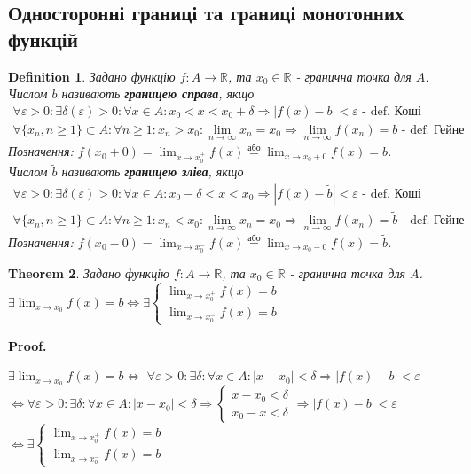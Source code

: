 \documentclass[a4paper, 14pt]{article}
\makeatletter
\def\qed{$\blacksquare$}
\theoremstyle{theoremdd}
\newtheorem{theorem}{Theorem}[subsection]
\theoremstyle{theoremdd}
\newtheorem{definition}[theorem]{Definition}
\theoremstyle{theoremdd}
\theoremstyle{theoremdd}
\theoremstyle{theoremdd}
\theoremstyle{theoremdd}
\theoremstyle{theoremdd}
\theoremstyle{theoremdd}
\renewenvironment{proof}[1][Proof.\\]{\par
\pushQED{\hfill \qed}%
\normalfont \topsep6\p@\@plus6\p@\relax
\trivlist
\item\relax
{\bfseries
#1\@addpunct{.}}\hspace\labelsep\ignorespaces
}{%
\popQED\endtrivlist\@endpefalse
}
\makeatother
\begin{document}
	\subsection{Односторонні границі та границі монотонних функцій}
\begin{definition}
Задано функцію $f: A \to \mathbb{R}$, та $x_0 \in \mathbb{R}$ - гранична точка для $A$.\\
Числом $b$ називають \textbf{границею справа}, якщо
\begin{align*}
\forall \varepsilon > 0: \exists \delta(\varepsilon)>0: \forall x \in A: x_0<x<x_0+\delta \Rightarrow |f(x)-b|<\varepsilon \textrm{ - def. Коші}\\
\forall \{x_n,n\geq 1\} \subset A: \forall n \geq 1: x_n > x_0: \lim_{n \to \infty}x_n = x_0 \Rightarrow \lim_{n \to \infty}f(x_n) = b \textrm{ - def. Гейне}
\end{align*}
Позначення: $\displaystyle f(x_0+0) = \lim_{x \to x_0^+} f(x) \overset{\text{або}}{=} \lim_{x \to x_0+0} f(x) = b$.\\
Числом $\tilde{b}$ називають \textbf{границею зліва}, якщо
\begin{align*}
\forall \varepsilon > 0: \exists \delta(\varepsilon)>0: \forall x \in A:  x_0-\delta<x<x_0 \Rightarrow |f(x)-\tilde{b}|<\varepsilon \textrm{ - def. Коші}\\
\forall \{x_n,n\geq 1\} \subset A: \forall n \geq 1: x_n < x_0: \lim_{n \to \infty}x_n = x_0 \Rightarrow \lim_{n \to \infty}f(x_n) = \tilde{b} \textrm{ - def. Гейне}
\end{align*}
Позначення: $\displaystyle f(x_0-0) = \lim_{x \to x_0^-} f(x) \overset{\text{або}}{=} \lim_{x \to x_0-0} f(x) = \tilde{b}$.
\end{definition}

\begin{theorem}
Задано функцію $f: A \to \mathbb{R}$, та $x_0 \in \mathbb{R}$ - гранична точка для $A$.\\
$\exists \displaystyle \lim_{x \to x_0} f(x) = b \iff \exists \begin{cases} \displaystyle \lim_{x \to x_0^+} f(x) = b \\ \displaystyle \lim_{x \to x_0^-} f(x) = b \end{cases}$
\end{theorem}

\begin{proof}
$\exists \displaystyle \lim_{x \to x_0} f(x) = b \iff$
$\forall \varepsilon > 0: \exists \delta: \forall x \in A: |x-x_0|<\delta \Rightarrow |f(x)-b|<\varepsilon$\\
$\iff \forall \varepsilon > 0: \exists \delta: \forall x \in A: |x-x_0|<\delta \Rightarrow \begin{cases} x-x_0<\delta \\ x_0-x<\delta \end{cases} \Rightarrow |f(x)-b|<\varepsilon$ \\ $\iff \exists \begin{cases} \displaystyle \lim_{x \to x_0^+} f(x) = b \\ \displaystyle \lim_{x \to x_0^-} f(x) = b \end{cases}$
\end{proof}
\end{document}
